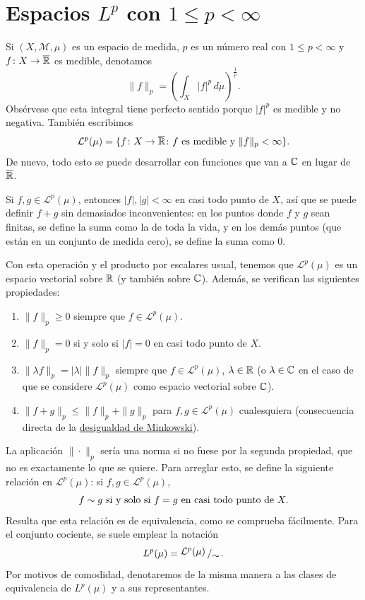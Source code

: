 \documentclass[a4paper, 11pt, oneside]{report}
\begin{document}
\section[Espacios \texorpdfstring{$L^p$}{Lp} con \texorpdfstring{$1 \leq p < \infty$}{1<=p<∞}]{Espacios \texorpdfstring{\boldmath$L^p$}{Lp} con \texorpdfstring{\boldmath$1 \leq p < \infty$}{1<=p<∞}}

Si $(X,\mathcal{M},\mu)$ es un espacio de medida, $p$ es un número real con $1 \leq p < \infty$ y $f \colon X \to \overline{\mathbb R}$ es medible, denotamos
\[\|f\|_p = \left(\int_X |f|^p \, d\mu\right)^{\frac{1}{p}}.\]
Obsérvese que esta integral tiene perfecto sentido porque $|f|^p$ es medible y no negativa. También escribimos
\[\mathcal{L}^p(\mu) = \{f \colon X \to \overline{\mathbb R} \colon f \textup{ es medible y } \|f\|_p < \infty\}.\]
De nuevo, todo esto se puede desarrollar con funciones que van a $\mathbb C$ en lugar de $\overline{\mathbb R}$.

Si $f,g \in \mathcal{L}^p(\mu)$, entonces $|f|,|g| < \infty$ en casi todo punto de $X$, así que se puede definir $f+g$ sin demasiados inconvenientes: en los puntos donde $f$ y $g$ sean finitas, se define la suma como la de toda la vida, y en los demás puntos (que están en un conjunto de medida cero), se define la suma como $0$. 

Con esta operación y el producto por escalares usual, tenemos que $\mathcal{L}^p(\mu)$ es un espacio vectorial sobre $\mathbb R$ (y también sobre $\mathbb C$). Además, se verifican las siguientes propiedades:
\begin{enumerate}
  \item $\|f\|_p \geq 0$ siempre que $f \in \mathcal{L}^p(\mu)$.
  \item $\|f\|_p = 0$ si y solo si $|f| = 0$ en casi todo punto de $X$.
  \item $\|\lambda f\|_p = |\lambda| \|f\|_p$ siempre que $f \in \mathcal{L}^p(\mu)$, $\lambda \in \mathbb R$ (o $\lambda \in \mathbb C$ en el caso de que se considere $\mathcal{L}^p(\mu)$ como espacio vectorial sobre $\mathbb C$).
  \item $\|f+g\|_p \leq \|f\|_p+\|g\|_p$ para $f,g \in \mathcal{L}^p(\mu)$ cualesquiera (consecuencia directa de la \hyperref[teo:1.2.7]{\color{c1}desigualdad de Minkowski}).
\end{enumerate}

La aplicación $\|\cdot\|_p$ sería una norma si no fuese por la segunda propiedad, que no es exactamente lo que se quiere. Para arreglar esto, se define la siguiente relación en $\mathcal{L}^p(\mu)$: si $f,g \in \mathcal{L}^p(\mu)$,
\[f \sim g \textup{ si y solo si } f=g \textup{ en casi todo punto de } X.\]
Resulta que esta relación es de equivalencia, como se comprueba fácilmente. Para el conjunto cociente, se suele emplear la notación
\[L^p(\mu) = \bigslant{\mathcal{L}^p(\mu)}{\sim}.\]
Por motivos de comodidad, denotaremos de la misma manera a las clases de equivalencia de $L^p(\mu)$ y a sus representantes.
\end{document}
